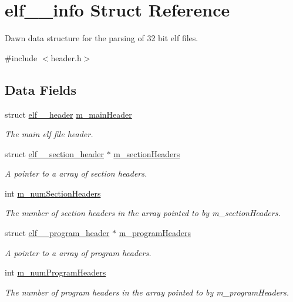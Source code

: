 \hypertarget{structelf__32__info}{
\section{elf\_\_\-info Struct Reference}
\label{structelf__32__info}
}


Dawn data structure for the parsing of 32 bit elf files.  




{\ttfamily \#include $<$header.h$>$}

\subsection*{Data Fields}
\begin{DoxyCompactItemize}
\item 
struct \hyperlink{structelf__32__header}{elf\_\_\-header} \hyperlink{structelf__32__info_afad69f71c04aeaa868d04063781741ea}{m\_\-mainHeader}
\begin{DoxyCompactList}\small\item\em The main elf file header. \item\end{DoxyCompactList}\item 
struct \hyperlink{structelf__32__section__header}{elf\_\_\-section\_\-header} $\ast$ \hyperlink{structelf__32__info_ab8d46ddc9a0d9ba619b7ab8d296e8b52}{m\_\-sectionHeaders}
\begin{DoxyCompactList}\small\item\em A pointer to a array of section headers. \item\end{DoxyCompactList}\item 
int \hyperlink{structelf__32__info_a701e263cc9e77c5e031b01faef03ed79}{m\_\-numSectionHeaders}
\begin{DoxyCompactList}\small\item\em The number of section headers in the array pointed to by m\_\-sectionHeaders. \item\end{DoxyCompactList}\item 
struct \hyperlink{structelf__32__program__header}{elf\_\_\-program\_\-header} $\ast$ \hyperlink{structelf__32__info_a26df4e771f5978aa40f2ddef21370e4b}{m\_\-programHeaders}
\begin{DoxyCompactList}\small\item\em A pointer to a array of program headers. \item\end{DoxyCompactList}\item 
int \hyperlink{structelf__32__info_a3d0840d804c71febb4e372812f9f5b3e}{m\_\-numProgramHeaders}
\begin{DoxyCompactList}\small\item\em The number of program headers in the array pointed to by m\_\-programHeaders. \item\end{DoxyCompactList}\end{DoxyCompactItemize}


